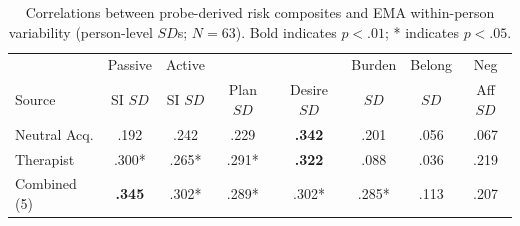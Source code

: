 \begin{table}[H]
\centering
\footnotesize
\caption{Correlations between probe-derived risk composites and EMA within-person variability (person-level $SD$s; $N = 63$). Bold indicates $p < .01$; * indicates $p < .05$.}
\label{tab:sd_correlations}
\setlength{\tabcolsep}{5pt}
\begin{tabular}{@{}lccccccc@{}}
\toprule
 & Passive & Active & & & Burden & Belong & Neg \\
Source & SI $SD$ & SI $SD$ & Plan $SD$ & Desire $SD$ & $SD$ & $SD$ & Aff $SD$ \\
\midrule
Neutral Acq. & .192 & .242 & .229 & \textbf{.342} & .201 & .056 & .067 \\
Therapist & .300* & .265* & .291* & \textbf{.322} & .088 & .036 & .219 \\
Combined (5) & \textbf{.345} & .302* & .289* & .302* & .285* & .113 & .207 \\
\bottomrule
\end{tabular}
\end{table}
